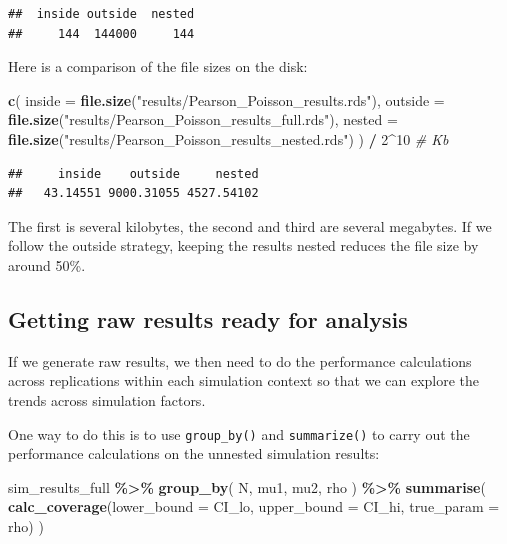 \documentclass[
]{book}
\newenvironment{Shaded}{\begin{snugshade}}{\end{snugshade}}
\newcommand{\AttributeTok}[1]{\textcolor[rgb]{0.13,0.29,0.53}{#1}}
\newcommand{\CommentTok}[1]{\textcolor[rgb]{0.56,0.35,0.01}{\textit{#1}}}
\newcommand{\DecValTok}[1]{\textcolor[rgb]{0.00,0.00,0.81}{#1}}
\newcommand{\FunctionTok}[1]{\textcolor[rgb]{0.13,0.29,0.53}{\textbf{#1}}}
\newcommand{\NormalTok}[1]{#1}
\newcommand{\SpecialCharTok}[1]{\textcolor[rgb]{0.81,0.36,0.00}{\textbf{#1}}}
\newcommand{\StringTok}[1]{\textcolor[rgb]{0.31,0.60,0.02}{#1}}
\begin{document}
\begin{verbatim}
##  inside outside  nested 
##     144  144000     144
\end{verbatim}

Here is a comparison of the file sizes on the disk:

\begin{Shaded}
\begin{Highlighting}[]
\FunctionTok{c}\NormalTok{(}
  \AttributeTok{inside =} \FunctionTok{file.size}\NormalTok{(}\StringTok{"results/Pearson\_Poisson\_results.rds"}\NormalTok{),}
  \AttributeTok{outside =} \FunctionTok{file.size}\NormalTok{(}\StringTok{"results/Pearson\_Poisson\_results\_full.rds"}\NormalTok{),}
  \AttributeTok{nested =} \FunctionTok{file.size}\NormalTok{(}\StringTok{"results/Pearson\_Poisson\_results\_nested.rds"}\NormalTok{)}
\NormalTok{) }\SpecialCharTok{/} \DecValTok{2}\SpecialCharTok{\^{}}\DecValTok{10} \CommentTok{\# Kb}
\end{Highlighting}
\end{Shaded}

\begin{verbatim}
##     inside    outside     nested 
##   43.14551 9000.31055 4527.54102
\end{verbatim}

The first is several kilobytes, the second and third are several megabytes. If we follow the outside strategy, keeping the results nested reduces the file size by around 50\%.

\subsection{Getting raw results ready for analysis}\label{getting-raw-results-ready-for-analysis}

If we generate raw results, we then need to do the performance calculations across replications within each simulation context so that we can explore the trends across simulation factors.

One way to do this is to use \texttt{group\_by()} and \texttt{summarize()} to carry out the performance calculations on the unnested simulation results:

\begin{Shaded}
\begin{Highlighting}[]
\NormalTok{sim\_results\_full }\SpecialCharTok{\%\textgreater{}\%}
  \FunctionTok{group\_by}\NormalTok{( N, mu1, mu2, rho ) }\SpecialCharTok{\%\textgreater{}\%}
  \FunctionTok{summarise}\NormalTok{( }
    \FunctionTok{calc\_coverage}\NormalTok{(}\AttributeTok{lower\_bound =}\NormalTok{ CI\_lo, }\AttributeTok{upper\_bound =}\NormalTok{ CI\_hi, }\AttributeTok{true\_param =}\NormalTok{ rho)}
\NormalTok{  )}
\end{Highlighting}
\end{Shaded}
\end{document}
